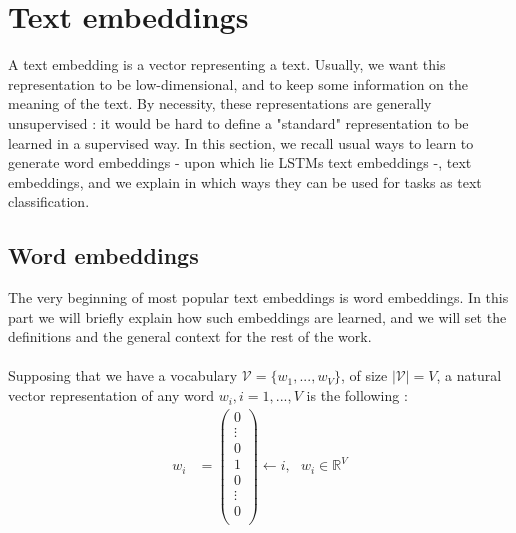 \documentclass{article}
\newcommand{\R}{\mathbb R}
\begin{document}
\tableofcontents
\newpage

\section{Text embeddings}

A text embedding is a vector representing a text. Usually, 
we want this representation to be low-dimensional, and to 
keep some information on the meaning of the text. By necessity, 
these representations are generally unsupervised : it would be 
hard to define a "standard" representation to be learned in a 
supervised way. In this section, we recall usual ways to 
learn to generate word embeddings - upon which lie LSTMs text embeddings -, 
text embeddings, and we explain in which ways they can be used for 
tasks as text classification.


\subsection{Word embeddings}

The very beginning of most popular
text embeddings is word embeddings. In this part
we will briefly explain how such embeddings are learned, and we will
set the definitions and the general context for the rest of the 
work. \\ \\
Supposing that we have a vocabulary 
$\mathcal{V} = \{w_1, ..., w_V \}$, of size 
$| \mathcal{V} | = V$, a natural vector representation of any word 
$w_i, i=1, ..., V$ is the following :
\begin{align*}
    w_i &= 
    \left (
    \begin{array}{c}
        0 \\
        \vdots \\
        0 \\
        1 \\
        0 \\
        \vdots \\
        0 \\
    \end{array}
    \right ) \leftarrow i,\ \ \ w_i \in \R^V
\end{align*}
\end{document}
